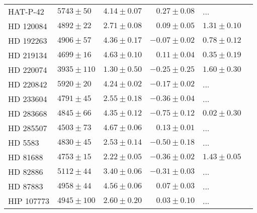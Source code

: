 \documentclass[fleqn]{fcup-thesis}
\newcommand{\object}[1]{#1}
\begin{document}
\begin{landscape}
\begin{longtable}{lllrll}
      \object{HAT-P-42}        &    $5743 \pm  50$   &    $4.14 \pm 0.07$   &    $ 0.27 \pm 0.08$   &          ...         &    \citet{Boisse2013}       \\
      \object{HD 120084}       &    $4892 \pm  22$   &    $2.71 \pm 0.08$   &    $ 0.09 \pm 0.05$   &    $1.31 \pm 0.10$   &    \citet{Sato2013}         \\
      \object{HD 192263}       &    $4906 \pm  57$   &    $4.36 \pm 0.17$   &    $-0.07 \pm 0.02$   &    $0.78 \pm 0.12$   &    \citet{Tsantaki2013}     \\
      \object{HD 219134}       &    $4699 \pm  16$   &    $4.63 \pm 0.10$   &    $ 0.11 \pm 0.04$   &    $0.35 \pm 0.19$   &    \citet{Motalebi2015}     \\
      \object{HD 220074}       &    $3935 \pm 110$   &    $1.30 \pm 0.50$   &    $-0.25 \pm 0.25$   &    $1.60 \pm 0.30$   &    \citet{Lee2013}          \\
      \object{HD 220842}       &    $5920 \pm  20$   &    $4.24 \pm 0.02$   &    $-0.17 \pm 0.02$   &          ...         &    \citet{Hebrard2016}      \\
      \object{HD 233604}       &    $4791 \pm  45$   &    $2.55 \pm 0.18$   &    $-0.36 \pm 0.04$   &          ...         &    \citet{Nowak2013}        \\
      \object{HD 283668}       &    $4845 \pm  66$   &    $4.35 \pm 0.12$   &    $-0.75 \pm 0.12$   &    $0.02 \pm 0.30$   &    \citet{Wilson2016}       \\
      \object{HD 285507}       &    $4503 \pm  73$   &    $4.67 \pm 0.06$   &    $ 0.13 \pm 0.01$   &          ...         &    \citet{Quinn2014}        \\
      \object{HD 5583}         &    $4830 \pm  45$   &    $2.53 \pm 0.14$   &    $-0.50 \pm 0.18$   &          ...         &    \citet{Niedzielski2016}  \\
      \object{HD 81688}        &    $4753 \pm  15$   &    $2.22 \pm 0.05$   &    $-0.36 \pm 0.02$   &    $1.43 \pm 0.05$   &    \citet{Sato2008}         \\
      \object{HD 82886}        &    $5112 \pm  44$   &    $3.40 \pm 0.06$   &    $-0.31 \pm 0.03$   &          ...         &    \citet{Johnson2011}      \\
      \object{HD 87883}        &    $4958 \pm  44$   &    $4.56 \pm 0.06$   &    $ 0.07 \pm 0.03$   &          ...         &    \citet{Valenti2005}      \\
      \object{HIP 107773}      &    $4945 \pm 100$   &    $2.60 \pm 0.20$   &    $ 0.03 \pm 0.10$   &          ...         &    \citet{Jones2015}        \\

\end{longtable}
\end{landscape}
\end{document}
